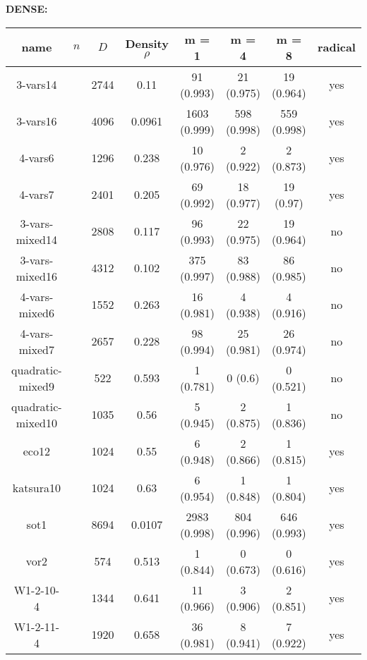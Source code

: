 \documentclass[12pt]{article}
\begin{document}
	\textbf{DENSE:\\}
	\begin{tabular}{c|c|c|c|c|c|c|c}
		\textbf{name}& $n$ & $D$ & \textbf{Density $\rho$} & m = 1 & m = 4 & m = 8 & \textbf{radical} \\
		\hline
		3-vars14& &2744&0.11&91 (0.993)&21 (0.975)&19 (0.964)&yes\\
		3-vars16& &4096&0.0961&1603 (0.999)&598 (0.998)&559 (0.998)&yes\\
		4-vars6& &1296&0.238&10 (0.976)&2 (0.922)&2 (0.873)&yes\\
		4-vars7& &2401&0.205&69 (0.992)&18 (0.977)&19 (0.97)&yes\\
		3-vars-mixed14& &2808&0.117&96 (0.993)&22 (0.975)&19 (0.964)&no\\
		3-vars-mixed16& &4312&0.102&375 (0.997)&83 (0.988)&86 (0.985)&no\\
		4-vars-mixed6& &1552&0.263&16 (0.981)&4 (0.938)&4 (0.916)&no\\
		4-vars-mixed7& &2657&0.228&98 (0.994)&25 (0.981)&26 (0.974)&no\\
		quadratic-mixed9& &522&0.593&1 (0.781)&0 (0.6)&0 (0.521)&no\\
		quadratic-mixed10& &1035&0.56&5 (0.945)&2 (0.875)&1 (0.836)&no\\
		eco12& &1024&0.55&6 (0.948)&2 (0.866)&1 (0.815)&yes\\
		katsura10& &1024&0.63&6 (0.954)&1 (0.848)&1 (0.804)&yes\\
		sot1& &8694&0.0107&2983 (0.998)&804 (0.996)&646 (0.993)&yes\\
		vor2& &574&0.513&1 (0.844)&0 (0.673)&0 (0.616)&yes\\
		W1-2-10-4& &1344&0.641&11 (0.966)&3 (0.906)&2 (0.851)&yes\\
		W1-2-11-4& &1920&0.658&36 (0.981)&8 (0.941)&7 (0.922)&yes\\
	\end{tabular}\\
	
\end{document}
